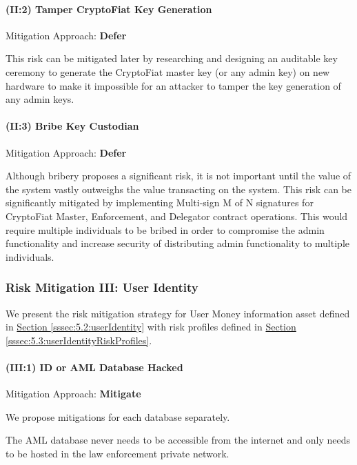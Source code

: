 \documentclass[12pt]{article} %
\newcommand{\hypersectionref}[1]{\hyperref[#1]{Section \ref{#1}}}
\begin{document}
{\paragraph{(II:2) Tamper CryptoFiat Key Generation}

Mitigation Approach: \textbf{Defer}

This risk can be mitigated later by researching and designing an auditable key ceremony to generate the CryptoFiat master key (or any admin key) on new hardware to make it impossible for an attacker to tamper the key generation of any admin keys.

\paragraph{(II:3) Bribe Key Custodian}

Mitigation Approach: \textbf{Defer}

Although bribery proposes a significant risk, it is not important until the value of the system vastly outweighs the value transacting on the system. This risk can be significantly mitigated by implementing Multi-sign M of N signatures for CryptoFiat Master, Enforcement, and Delegator contract operations. This would require multiple individuals to be bribed in order to compromise the admin functionality and increase security of distributing admin functionality to multiple individuals.

\subsubsection{Risk Mitigation III: User Identity} \label{sssec:5.4:riskMitigationUserIdentity}

We present the risk mitigation strategy for User Money information asset defined in \hypersectionref{sssec:5.2:userIdentity} with risk profiles defined in \hypersectionref{sssec:5.3:userIdentityRiskProfiles}.

\paragraph{(III:1) ID or AML Database Hacked}

Mitigation Approach: \textbf{Mitigate}

We propose mitigations for each database separately.

The AML database never needs to be accessible from the internet and only needs to be hosted in the law enforcement private network.

}
\end{document}
